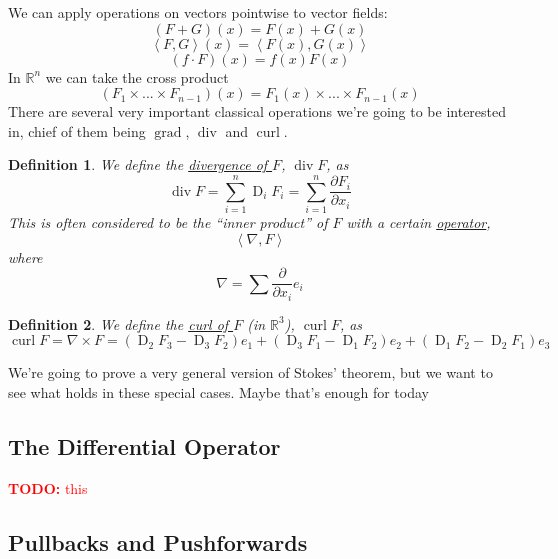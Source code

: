 \documentclass{article}
\newtheorem{definition}{Definition}
\DeclareMathOperator{\grad}{grad}
\DeclareMathOperator{\Div}{div}
\DeclareMathOperator{\curl}{curl}
\DeclareMathOperator{\D}{D}
\newcommand{\reals}[0]{\mathbb{R}}
\newcommand{\ip}[2]{\left\langle#1,#2\right\rangle}
\newcommand{\prt}[2]{\frac{\partial #1}{\partial #2}}
\newcommand{\TODO}[1]{\textcolor{red}{\textbf{TODO:} #1}}
\begin{document}
We can apply operations on vectors pointwise to vector fields:
\begin{equation}
  (F + G)(x) = F(x) + G(x)
\end{equation}
\begin{equation}
  \ip{F}{G}(x) = \ip{F(x)}{G(x)}
\end{equation}
\begin{equation}
  (f \cdot F)(x) = f(x)F(x)
\end{equation}
In \(\reals^n\) we can take the cross product
\begin{equation}
  (F_1 \times ... \times F_{n - 1})(x) = F_1(x) \times ... \times F_{n - 1}(x)
\end{equation}
There are several very important classical operations we're going to be interested in, chief of them being \(\grad\), \(\Div\) and \(\curl\).
\begin{definition}
 We define the \underline{divergence of \(F\)}, \(\Div F\), as
 \begin{equation}
  \Div F = \sum_{i = 1}^n\D_iF_i = \sum_{i = 1}^n\prt{F_i}{x_i}
 \end{equation}
 This is often considered to be the ``inner product'' of \(F\) with a certain \underline{operator},
 \begin{equation}
  \ip{\nabla}{F}
 \end{equation}
 where
 \begin{equation}
  \nabla = \sum\prt{}{x_i}e_i
 \end{equation}
\end{definition}
\begin{definition}
  We define the \underline{curl of \(F\)} (in \(\reals^3\)), \(\curl F\), as
  \begin{equation}
    \curl F = \nabla \times F = (\D_2F_3 - \D_3F_2)e_1 + (\D_3F_1 - \D_1F_2)e_2 + (\D_1F_2 - \D_2F_1)e_3
  \end{equation}
\end{definition}
We're going to prove a very general version of Stokes' theorem, but we want to see what holds in these special cases. Maybe that's enough for today

\subsection{The Differential Operator}

\TODO{this}

\subsection{Pullbacks and Pushforwards}
\end{document}
